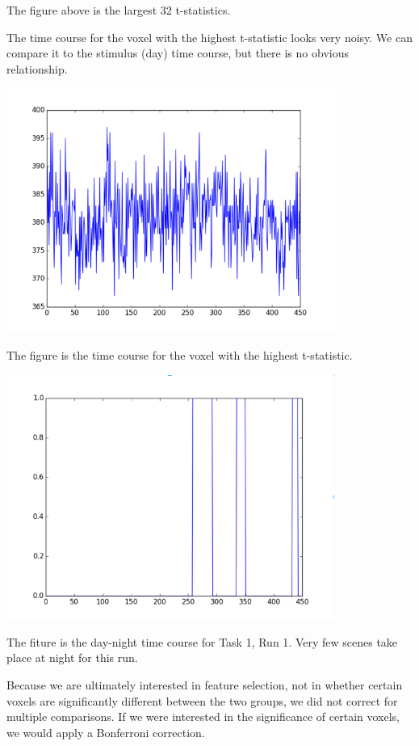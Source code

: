 \documentclass[11pt]{article}
\begin{document}
The figure above is the largest 32 t-statistics.

The time course for the voxel with the highest t-statistic looks very noisy.
We can compare it to the stimulus (day) time course, but there is no obvious
relationship.


\begin{center}
\includegraphics[height=8cm]{4}
\end{center}

The figure is the time course for the voxel with the highest t-statistic.

\begin{center}
\includegraphics[height=8cm]{5}
\end{center}

The fiture is the day-night time course for Task 1, Run 1.  Very few scenes
take place at night for this run.

Because we are ultimately interested in feature selection, not in whether
certain voxels are significantly different between the two groups, we did not
correct for multiple comparisons.  If we were interested in the significance
of certain voxels, we would apply a Bonferroni correction.
\end{document}
